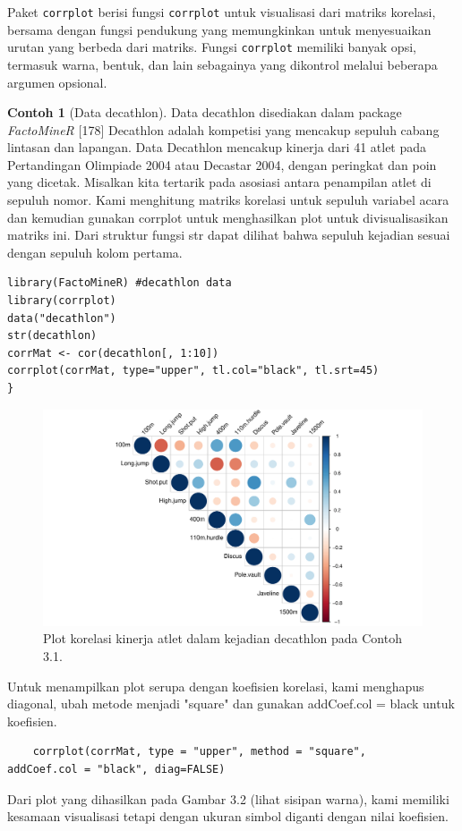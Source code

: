 \documentclass[a4paper,12pt]{article}
\theoremstyle{definition}
\newtheorem{example}{Contoh}[section]
\begin{document}
Paket \texttt{corrplot} berisi fungsi \texttt{corrplot} untuk visualisasi dari matriks korelasi, bersama dengan fungsi pendukung yang memungkinkan untuk menyesuaikan urutan yang berbeda dari matriks. Fungsi \texttt{corrplot} memiliki banyak opsi, termasuk warna, bentuk, dan lain sebagainya yang dikontrol melalui beberapa argumen opsional.
\begin{example}[Data decathlon]
    Data decathlon disediakan dalam package \textit{FactoMineR} [178]
    Decathlon adalah kompetisi yang mencakup sepuluh cabang lintasan dan lapangan. Data Decathlon mencakup kinerja dari 41 atlet pada Pertandingan Olimpiade 2004 atau Decastar 2004, dengan peringkat dan poin yang dicetak. Misalkan kita tertarik pada asosiasi antara penampilan atlet di sepuluh nomor. Kami menghitung matriks korelasi untuk sepuluh variabel acara dan kemudian gunakan corrplot untuk menghasilkan plot untuk divisualisasikan matriks ini. Dari struktur fungsi str dapat dilihat bahwa sepuluh kejadian sesuai dengan sepuluh kolom pertama.

\begin{lstlisting}
library(FactoMineR) #decathlon data
library(corrplot)
data("decathlon")
str(decathlon)
corrMat <- cor(decathlon[, 1:10])
corrplot(corrMat, type="upper", tl.col="black", tl.srt=45)
}
\end{lstlisting}
\end{example}

\begin{figure}[H]
    \centering
    \includegraphics[width=16cm]{gb/K2G4-Scatterplot.pdf}
    \caption{Plot korelasi kinerja atlet dalam kejadian decathlon pada Contoh 3.1.}
    \label{fig:mesh1}
\end{figure}

Untuk menampilkan plot serupa dengan koefisien korelasi, kami menghapus
diagonal, ubah metode menjadi "square" dan gunakan addCoef.col = black
untuk koefisien.
\begin{lstlisting}
    corrplot(corrMat, type = "upper", method = "square",
addCoef.col = "black", diag=FALSE)

\end{lstlisting}
Dari plot yang dihasilkan pada Gambar 3.2 (lihat sisipan warna), kami memiliki kesamaan
visualisasi tetapi dengan ukuran simbol diganti dengan nilai
koefisien.
\end{document}
